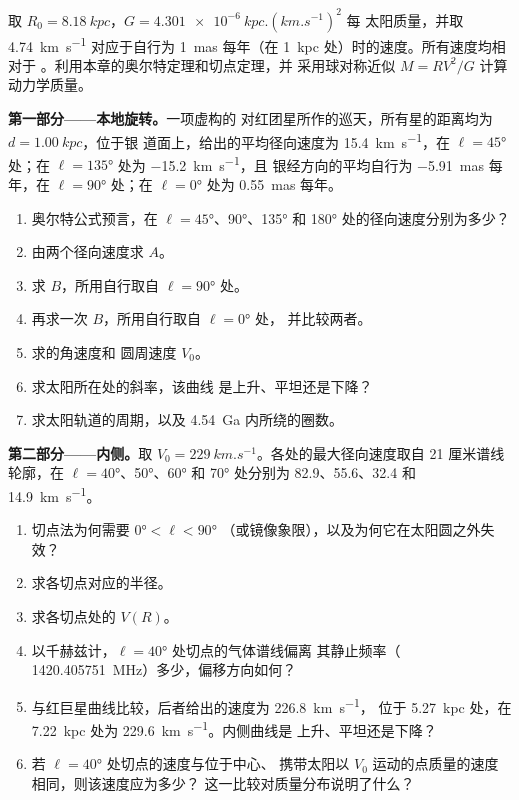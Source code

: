 \begin{problem}
\label{pb:b3:milky-way-galaxies:1}
取 $R_0 = \qty{8.18}{kpc}$，$G = \qty{4.301e-6}{kpc.(km.s^{-1})^2}$ 每
太阳质量，并取 \qty{4.74}{km.s^{-1}} 对应于自行为
\qty{1}{mas} 每年（在 \qty{1}{kpc} 处）时的速度。所有速度均相对于
。利用本章的奥尔特定理和切点定理，并
采用球对称近似 $M = RV^2/G$ 计算动力学质量。

\medskip\noindent\textbf{第一部分——本地旋转。}一项虚构的
对红团星所作的巡天，所有星的距离均为 $d = \qty{1.00}{kpc}$，位于银
道面上，给出的平均径向速度为 \qty{+15.4}{km.s^{-1}}，在
$\ell = \ang{45}$ 处；在 $\ell = \ang{135}$ 处为 \qty{-15.2}{km.s^{-1}}，且
银经方向的平均自行为 \qty{-5.91}{mas} 每年，在
$\ell = \ang{90}$ 处；在 $\ell = \ang{0}$ 处为 \qty{+0.55}{mas} 每年。
\begin{enumerate}
\item 奥尔特公式预言，在
  $\ell = \ang{45}$、\ang{90}、\ang{135} 和 \ang{180} 处的径向速度分别为多少？
\item 由两个径向速度求 $A$。
\item 求 $B$，所用自行取自 $\ell = \ang{90}$ 处。
\item 再求一次 $B$，所用自行取自 $\ell = \ang{0}$ 处，
  并比较两者。
\item 求的角速度和
  圆周速度 $V_0$。
\item 求太阳所在处的斜率，该曲线
  是上升、平坦还是下降？
\item 求太阳轨道的周期，以及
  \qty{4.54}{Ga} 内所绕的圈数。
\end{enumerate}

\medskip\noindent\textbf{第二部分——内侧。}取
$V_0 = \qty{229}{km.s^{-1}}$。各处的最大径向速度取自
21 厘米谱线轮廓，在 $\ell = \ang{40}$、\ang{50}、\ang{60} 和 \ang{70} 处分别为
82.9、55.6、32.4 和 \qty{14.9}{km.s^{-1}}。
\begin{enumerate}[resume]
\item 切点法为何需要 $\ang{0} < \ell < \ang{90}$
  （或镜像象限），以及为何它在太阳圆之外失效？
\item 求各切点对应的半径。
\item 求各切点处的 $V(R)$。
\item 以千赫兹计，$\ell = \ang{40}$ 处切点的气体谱线偏离
  其静止频率（
  \qty{1420.405751}{MHz}）多少，偏移方向如何？
\item 与红巨星曲线比较，后者给出的速度为 \qty{226.8}{km.s^{-1}}，
  位于 \qty{5.27}{kpc} 处，在 \qty{7.22}{kpc} 处为 \qty{229.6}{km.s^{-1}}。内侧曲线是
  上升、平坦还是下降？
\item 若 $\ell = \ang{40}$ 处切点的速度与位于中心、
  携带太阳以 $V_0$ 运动的点质量的速度相同，则该速度应为多少？
  这一比较对质量分布说明了什么？
\end{enumerate}


\end{problem}
